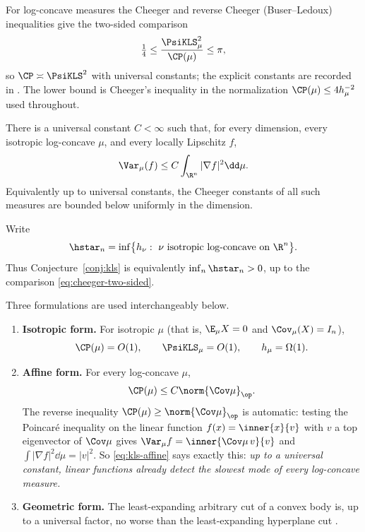 \documentclass[../../main.tex]{subfiles}
\begin{document}
For log-concave measures the Cheeger and reverse Cheeger (Buser--Ledoux) inequalities give the
two-sided comparison
\begin{equation}
  \tfrac14\le\frac{\PsiKLS_\mu^2}{\CP(\mu)}\le\pi ,
  \label{eq:cheeger-two-sided}
\end{equation}
so $\CP\asymp\PsiKLS^2$ with universal constants; the explicit constants are recorded in
\cite{Klartag2023Logarithmic,Milman2009Isoperimetric}. The lower bound is Cheeger's inequality in
the normalization $\CP(\mu)\le4h_\mu^{-2}$ used throughout.

\begin{conjecture}[KLS]
\label{conj:kls}
There is a universal constant $C<\infty$ such that, for every dimension, every isotropic
log-concave $\mu$, and every locally Lipschitz $f$,
\[
  \Var_\mu(f)\le C\int_{\R^n}|\nabla f|^2\dd\mu.
\]
Equivalently up to universal constants, the Cheeger constants of all such measures are bounded
below uniformly in the dimension.
\end{conjecture}

Write
\begin{equation}
  \hstar_n=\inf\bigl\{h_\nu:\ \nu\ \text{isotropic log-concave on }\R^n\bigr\}.
  \label{eq:hstar-def}
\end{equation}
Thus Conjecture~\ref{conj:kls} is equivalently $\inf_n\hstar_n>0$, up to the comparison
\eqref{eq:cheeger-two-sided}.

Three formulations are used interchangeably below.

\begin{enumerate}[label=(\alph*),leftmargin=2.2em]
  \item \textbf{Isotropic form.} For isotropic $\mu$ (that is, $\E_\mu X=0$ and $\Cov_\mu(X)=I_n$),
  \[
    \CP(\mu)=O(1),\qquad \PsiKLS_\mu=O(1),\qquad h_\mu=\Omega(1).
  \]

  \item \textbf{Affine form.} For every log-concave $\mu$,
  \begin{equation}
    \CP(\mu)\le C\norm{\Cov\mu}_\op .
    \label{eq:kls-affine}
  \end{equation}
  The reverse inequality $\CP(\mu)\ge\norm{\Cov\mu}_\op$ is automatic: testing the Poincar\'e
  inequality on the linear function $f(x)=\inner{x}{v}$ with $v$ a top eigenvector of $\Cov\mu$
  gives $\Var_\mu f=\inner{\Cov\mu\,v}{v}$ and $\int|\nabla f|^2\dd\mu=|v|^2$. So
  \eqref{eq:kls-affine} says exactly this: \emph{up to a universal constant, linear functions
  already detect the slowest mode of every log-concave measure.}

  \item \textbf{Geometric form.} The least-expanding arbitrary cut of a convex body is, up to a
  universal factor, no worse than the least-expanding hyperplane cut
  \cite{KannanLovaszSimonovits1995}.
\end{enumerate}
\end{document}
